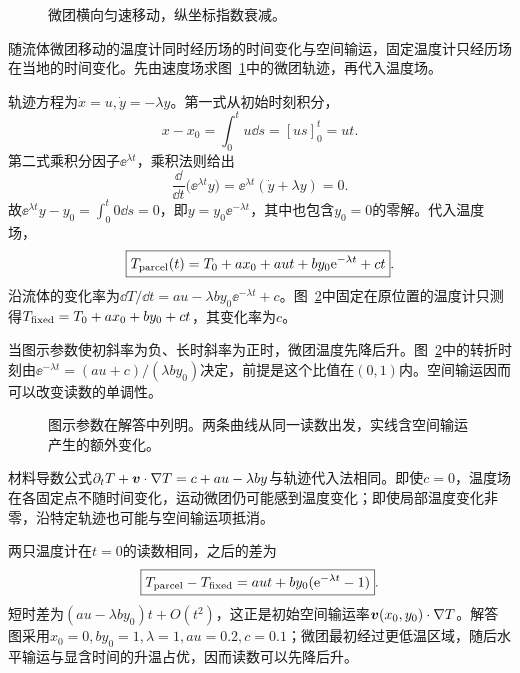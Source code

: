\begin{figure}[H]\centering
{}
\caption{微团横向匀速移动，纵坐标指数衰减。}\label{fig:c3-h18-q}
\end{figure}
\begin{solution}
随流体微团移动的温度计同时经历场的时间变化与空间输运，固定温度计只经历场在当地的时间变化。先由速度场求图~\ref{fig:c3-h18-q}中的微团轨迹，再代入温度场。


轨迹方程为$\dot x=u,\dot y=-\lambda y$。第一式从初始时刻积分，
\[x-x_0=\int_0^tu\dd s=[us]_0^t=ut.\]
第二式乘积分因子$\ee^{\lambda t}$，乘积法则给出
\[\frac{\dd}{\dd t}\bigl(\ee^{\lambda t}y\bigr)
=\ee^{\lambda t}(\dot y+\lambda y)=0.\]
故$\ee^{\lambda t}y-y_0=\int_0^t0\dd s=0$，即$y=y_0\ee^{-\lambda t}$，其中也包含$y_0=0$的零解。代入温度场，
\[\boxed{T_{\rm parcel}(t)=T_0+ax_0+aut+by_0\mathrm e^{-\lambda t}+ct}.
\]
沿流体的变化率为$\dd T/\dd t=au-\lambda by_0\ee^{-\lambda t}+c$。图~\ref{fig:c3-h18-s}中固定在原位置的温度计只测得$T_{\rm fixed}=T_0+ax_0+by_0+ct$，其变化率为$c$。


当图示参数使初斜率为负、长时斜率为正时，微团温度先降后升。图~\ref{fig:c3-h18-s}中的转折时刻由$\ee^{-\lambda t}=(au+c)/(\lambda by_0)$决定，前提是这个比值在$(0,1)$内。空间输运因而可以改变读数的单调性。

\begin{figure}[H]\centering
{}
\caption{图示参数在解答中列明。两条曲线从同一读数出发，实线含空间输运产生的额外变化。}\label{fig:c3-h18-s}
\end{figure}

材料导数公式$\partial_tT+\bm{v}\cdot\nabla T=c+au-\lambda by$与轨迹代入法相同。即使$c=0$，温度场在各固定点不随时间变化，运动微团仍可能感到温度变化；即使局部温度变化非零，沿特定轨迹也可能与空间输运项抵消。


两只温度计在$t=0$的读数相同，之后的差为
\[\boxed{T_{\rm parcel}-T_{\rm fixed}=aut+by_0(\mathrm e^{-\lambda t}-1)}.\]
短时差为$(au-\lambda by_0)t+O(t^2)$，这正是初始空间输运率$\bm{v}(x_0,y_0)\cdot\nabla T$。解答图采用$x_0=0,by_0=1,\lambda=1,au=0.2,c=0.1$；微团最初经过更低温区域，随后水平输运与显含时间的升温占优，因而读数可以先降后升。


\end{solution}
